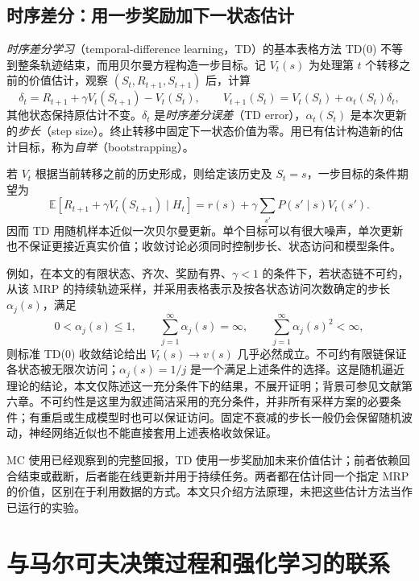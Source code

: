 \documentclass[UTF8,12pt,a4paper,fontset=fandol]{ctexart}
\begin{document}
\subsection{时序差分：用一步奖励加下一状态估计}

\emph{时序差分学习}（temporal-difference learning，TD）的基本表格方法 TD(0) 不等到整条轨迹结束，而用贝尔曼方程构造一步目标。记 $V_t(s)$ 为处理第 $t$ 个转移之前的价值估计，观察 $(S_t,R_{t+1},S_{t+1})$ 后，计算
\begin{equation}
  \delta_t=R_{t+1}+\gamma V_t(S_{t+1})-V_t(S_t),
  \qquad
  V_{t+1}(S_t)=V_t(S_t)+\alpha_t(S_t)\delta_t,
  \label{eq:mrp-td}
\end{equation}
其他状态保持原估计不变。$\delta_t$ 是\emph{时序差分误差}（TD error），$\alpha_t(S_t)$ 是本次更新的\emph{步长}（step size）。终止转移中固定下一状态价值为零。用已有估计构造新的估计目标，称为\emph{自举}（bootstrapping）。

若 $V_t$ 根据当前转移之前的历史形成，则给定该历史及 $S_t=s$，一步目标的条件期望为
\[
  \mathbb E[R_{t+1}+\gamma V_t(S_{t+1})\mid H_t]
  =r(s)+\gamma\sum_{s'}P(s'\mid s)V_t(s').
\]
因而 TD 用随机样本近似一次贝尔曼更新。单个目标可以有很大噪声，单次更新也不保证更接近真实价值；收敛讨论必须同时控制步长、状态访问和模型条件。

例如，在本文的有限状态、齐次、奖励有界、$\gamma<1$ 的条件下，若状态链不可约，从该 MRP 的持续轨迹采样，并采用表格表示及按各状态访问次数确定的步长 $\alpha_j(s)$，满足
\begin{equation}
  0<\alpha_j(s)\leq1,\qquad
  \sum_{j=1}^{\infty}\alpha_j(s)=\infty,\qquad
  \sum_{j=1}^{\infty}\alpha_j(s)^2<\infty,
  \label{eq:mrp-td-stepsizes}
\end{equation}
则标准 TD(0) 收敛结论给出 $V_t(s)\to v(s)$ 几乎必然成立。不可约有限链保证各状态被无限次访问；$\alpha_j(s)=1/j$ 是一个满足上述条件的选择。这是随机逼近理论的结论，本文仅陈述这一充分条件下的结果，不展开证明；背景可参见文献\cite{sutton-barto-mrp}第六章。不可约性是这里为叙述简洁采用的充分条件，并非所有采样方案的必要条件；有重启或生成模型时也可以保证访问。固定不衰减的步长一般仍会保留随机波动，神经网络近似也不能直接套用上述表格收敛保证。

MC 使用已经观察到的完整回报，TD 使用一步奖励加未来价值估计；前者依赖回合结束或截断，后者能在线更新并用于持续任务。两者都在估计同一个指定 MRP 的价值，区别在于利用数据的方式。本文只介绍方法原理，未把这些估计方法当作已运行的实验。

\section{与马尔可夫决策过程和强化学习的联系}
\label{sec:mrp-mdp}
\end{document}
